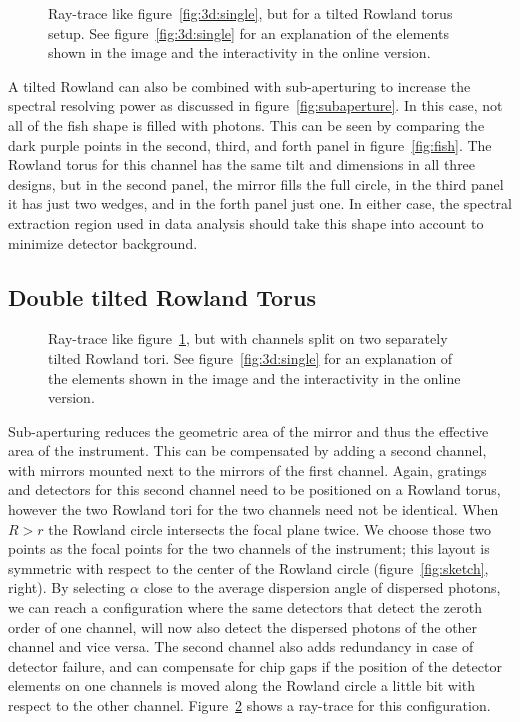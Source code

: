 \documentclass[linenumbers]{aastex631}
\begin{document}
\begin{figure}
    \caption{Ray-trace like figure~\ref{fig:3d:single}, but for a tilted Rowland torus setup. See figure~\ref{fig:3d:single} for an explanation of the elements shown in the image and the interactivity in the online version.
        }
    \label{fig:3d:tilted}
\end{figure}

A tilted Rowland can also be combined with sub-aperturing to increase the spectral resolving power as discussed in figure~\ref{fig:subaperture}. In this case, not all of the fish shape is filled with photons. This can be seen by comparing the dark purple points in the second, third, and forth panel in figure~\ref{fig:fish}. The Rowland torus for this channel has the same tilt and dimensions in all three designs, but in the second panel, the mirror fills the full circle, in the third panel it has just two wedges, and in the forth panel just one. In either case, the spectral extraction region used in data analysis should take this shape into account to minimize detector background.

\subsection{Double tilted Rowland Torus}
\begin{figure}
    \caption{Ray-trace like figure~\ref{fig:3d:tilted}, but with channels split on two separately tilted Rowland tori. See figure~\ref{fig:3d:single} for an explanation of the elements shown in the image and the interactivity in the online version.
        }
    \label{fig:3d:tilted_double}
\end{figure}

Sub-aperturing reduces the geometric area of the mirror and thus the effective area of the instrument. This can be compensated by adding a second channel, with mirrors mounted next to the mirrors of the first channel. Again, gratings and detectors for this second channel need to be positioned on a Rowland torus, however the two Rowland tori for the two channels need not be identical. When $R> r$ the Rowland circle intersects the focal plane twice. We choose those two points as the focal points for the two channels of the instrument; this layout is symmetric with respect to the center of the Rowland circle (figure~\ref{fig:sketch}, right). By selecting $\alpha$ close to the average dispersion angle of dispersed photons, we can reach a configuration where the same detectors that detect the zeroth order of one channel, will now also detect the dispersed photons of the other channel and vice versa. The second channel also adds redundancy in case of detector failure, and can compensate for chip gaps if the position of the detector elements on one channels is moved along the Rowland circle a little bit with respect to the other channel. Figure~\ref{fig:3d:tilted_double} shows a ray-trace for this configuration.
\end{document}
